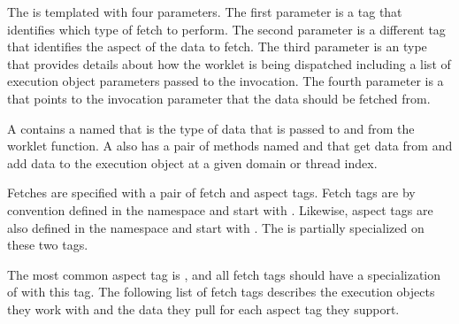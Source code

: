 The   is templated with four
parameters. The first parameter is a tag that identifies which type of
fetch to perform. The second parameter is a different tag that identifies
the aspect of the data to fetch. The third parameter is an
 type that provides details about how the
worklet is being dispatched including a list of execution object parameters
passed to the invocation. The fourth parameter is a  that
points to the invocation parameter that the data should be fetched from.

A  contains a  named
 that is the type of data that is passed to and from
the worklet function. A  also has a pair of methods
named  and  that get data from and add data
to the execution object at a given domain or thread index.


Fetches are specified with a pair of fetch and aspect tags. Fetch tags are by
convention defined in the \vtkmexecarg{} namespace and start with
. Likewise, aspect tags are also defined in the
\vtkmexecarg{} namespace and start with . The
  is partially specialized on these
two tags.

 The most common aspect tag is
, and all fetch tags should have a
specialization of  with this tag. The following list of
fetch tags describes the execution objects they work with and the data they
pull for each aspect tag they support.

